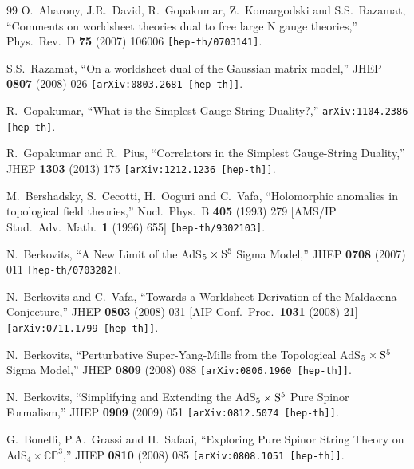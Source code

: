 \documentclass[12pt,a4paper]{article}
\begin{document}
\begin{thebibliography}{99}
  O.~Aharony, J.R.~David, R.~Gopakumar, Z.~Komargodski and S.S.~Razamat,
  ``Comments on worldsheet theories dual to free large N gauge theories,''
  Phys.\ Rev.\ D {\bf 75} (2007) 106006 
{\tt  [hep-th/0703141]}. 
  
  S.S.~Razamat,
  ``On a worldsheet dual of the Gaussian matrix model,''
  JHEP {\bf 0807} (2008) 026 
{\tt  [arXiv:0803.2681 [hep-th]]}. 
  
  R.~Gopakumar,
  ``What is the Simplest Gauge-String Duality?,''
{\tt  arXiv:1104.2386 [hep-th]}. 
  
  R.~Gopakumar and R.~Pius,
  ``Correlators in the Simplest Gauge-String Duality,''
  JHEP {\bf 1303}  (2013) 175
{\tt  [arXiv:1212.1236 [hep-th]]}.

  M.~Bershadsky, S.~Cecotti, H.~Ooguri and C.~Vafa,
  ``Holomorphic anomalies in topological field theories,''
  Nucl.\ Phys.\ B {\bf 405} (1993) 279 
  [AMS/IP Stud.\ Adv.\ Math.\  {\bf 1} (1996) 655]
 {\tt [hep-th/9302103]}.
  
  N.~Berkovits,
  ``A New Limit of the AdS$_5 \times {\rm S}^5$ Sigma Model,''
  JHEP {\bf 0708} (2007) 011 
 {\tt [hep-th/0703282]}. 
  
  N.~Berkovits and C.~Vafa,
  ``Towards a Worldsheet Derivation of the Maldacena Conjecture,''
  JHEP {\bf 0803} (2008) 031 
  [AIP Conf.\ Proc.\  {\bf 1031} (2008) 21]
 {\tt [arXiv:0711.1799 [hep-th]]}.
  
  N.~Berkovits,
  ``Perturbative Super-Yang-Mills from the Topological AdS$_5 \times {\rm S}^5$ Sigma Model,''
  JHEP {\bf 0809} (2008) 088 
{\tt  [arXiv:0806.1960 [hep-th]]}. 
  
  N.~Berkovits,
  ``Simplifying and Extending the AdS$_5 \times {\rm S}^5$ Pure Spinor Formalism,''
  JHEP {\bf 0909} (2009) 051 
{\tt  [arXiv:0812.5074 [hep-th]]}.
  
  G.~Bonelli, P.A.~Grassi and H.~Safaai,
  ``Exploring Pure Spinor String Theory on AdS$_4 \times \mathbb{CP}^3$,''
  JHEP {\bf 0810} (2008) 085 
 {\tt [arXiv:0808.1051 [hep-th]]}. 
   

\end{thebibliography}
\end{document}
